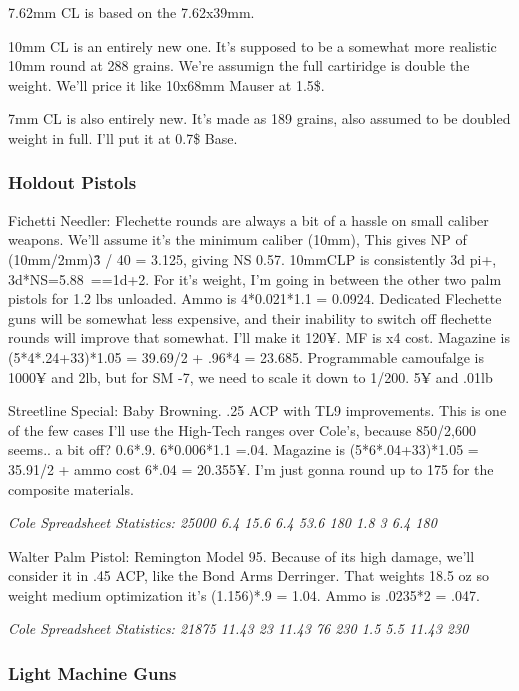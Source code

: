 \begin{multicols*}{2}
	 7.62mm CL is based on the 7.62x39mm.
	 
	 10mm CL is an entirely new one. It's supposed to be a somewhat more realistic 10mm round at 288 grains. We're assumign the full cartiridge is double the weight. We'll price it like 10x68mm Mauser at 1.5\$.
	 
	 7mm CL is also entirely new. It's made as 189 grains, also assumed to be doubled weight in full. I'll put it at 0.7\$ Base.
	
	\subsubsection{Holdout Pistols}
	
	Fichetti Needler: Flechette rounds are always a bit of a hassle on small caliber weapons. We'll assume it's the minimum caliber (10mm), This gives NP of (10mm/2mm)\^3 / 40 = 3.125, giving NS 0.57. 10mmCLP is consistently 3d pi+, 3d*NS=5.88~==1d+2. For it's weight, I'm going in between the other two palm pistols for 1.2 lbs unloaded. Ammo is 4*0.021*1.1 = 0.0924. Dedicated Flechette guns will be somewhat less expensive, and their inability to switch off flechette rounds will improve that somewhat. I'll make it 120¥. MF is x4 cost. Magazine is (5*4*.24+33)*1.05 = 39.69/2 + .96*4 = 23.685. Programmable camoufalge is 1000¥ and 2lb, but for SM -7, we need to scale it down to 1/200. 5¥ and .01lb
	
	Streetline Special: Baby Browning. .25 ACP with TL9 improvements. This is one of the few cases I'll use the High-Tech ranges over Cole's, because 850/2,600 seems.. a bit off? 0.6*.9. 6*0.006*1.1 =.04. Magazine is (5*6*.04+33)*1.05 = 35.91/2 + ammo cost 6*.04 = 20.355¥. I'm just gonna round up to 175 for the composite materials.
	
	\textit{\textcolor{OliveGreen}{Cole Spreadsheet Statistics: 25000 6.4 15.6 6.4 53.6 180 1.8 3 6.4 180}}
	
	Walter Palm Pistol: Remington Model 95. Because of its high damage, we'll consider it in .45 ACP, like the Bond Arms Derringer. That weights 18.5 oz so weight medium optimization it's (1.156)*.9 = 1.04. Ammo is .0235*2 = .047. 
	
	\textit{\textcolor{OliveGreen}{Cole Spreadsheet Statistics: 21875 11.43 23 11.43 76 230 1.5 5.5 11.43 230}}
	
	\subsubsection{Light Machine Guns}
	

\end{multicols*}
